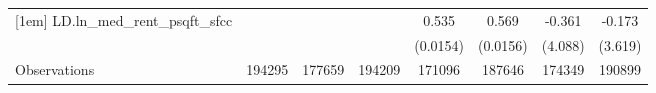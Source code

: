 {\begin{tabular}{l*{7}{c}}
[1em]
LD.ln\_med\_rent\_psqft\_sfcc&                  &                  &                  &    0.535\sym{***}&    0.569\sym{***}&   -0.361         &   -0.173         \\
          &                  &                  &                  & (0.0154)         & (0.0156)         &  (4.088)         &  (3.619)         \\
\hline
Observations&   194295         &   177659         &   194209         &   171096         &   187646         &   174349         &   190899         \\
\hline\hline
\end{tabular}
}
